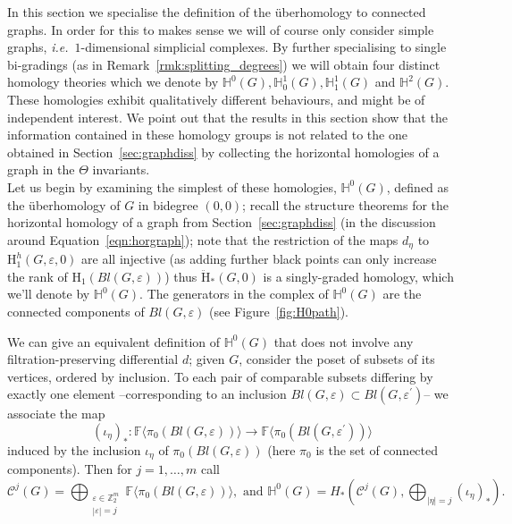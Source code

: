 \documentclass[11pt, a4paper, reqno, twoside, makeidx]{amsart}
\theoremstyle{remark}
\theoremstyle{plain}
\theoremstyle{definition}
\newcommand{\Z}{\mathbb{Z}}
\newcommand{\F}{\mathbb{F}}
\newcommand{\HH}{\mathrm{H}}
\newcommand{\uH}{\ddot{\mathrm{H}}}
\begin{document}
In this section we specialise the definition of the \"uberhomology to connected graphs.
In order for this to makes sense we will of course only consider simple graphs, \emph{i.e.}~$1$-dimensional simplicial complexes. By further specialising to single bi-gradings (as in Remark~\ref{rmk:splitting_degrees}) we will obtain four distinct homology theories which we denote by $\mathbb{H}^0(G), \mathbb{H}^1_0(G), \mathbb{H}^1_1(G)$ and $\mathbb{H}^2 (G)$. These homologies exhibit qualitatively different behaviours, and might be of independent interest. We point out that the results in this section show that the information contained in these homology groups is not related to the one obtained in Section~\ref{sec:graphdiss} by collecting the horizontal homologies of a graph in the $\Theta$ invariants. \\

Let us begin by examining the simplest of these homologies, $\mathbb{H}^0(G)$, defined as the \"uberhomology of $G$ in bidegree $(0,0)$; recall the structure theorems for the horizontal homology of a graph from Section~\ref{sec:graphdiss} (in the discussion around Equation~\eqref{eqn:horgraph}); note that the restriction of the maps $d_{\eta}$ to $\HH^h_1(G, \varepsilon , 0)$ are all injective (as adding further black points can only increase the rank of $\HH_1(Bl(G,\varepsilon))$) thus  $\uH_*(G, 0)$ is a singly-graded homology, which we'll denote by $\mathbb{H}^0(G)$.
The generators in the complex of $\mathbb{H}^0(G)$ are the connected components of $Bl(G,\varepsilon)$ (see Figure~\ref{fig:H0path}).

We can give an equivalent definition of $\mathbb{H}^0(G)$ that does not involve any filtration-preserving differential $d$; given $G$, 
consider the poset of subsets of its vertices, ordered by inclusion. To each pair of comparable subsets differing by exactly one element --corresponding to an inclusion $Bl(G,\varepsilon) \subset Bl(G ,\varepsilon^\prime)$-- we associate the map $$(\iota_\eta)_* : \F\langle \pi_0(Bl(G,\varepsilon)) \rangle \longrightarrow \F\langle\pi_0(Bl(G,\varepsilon^\prime)) \rangle $$ induced by the inclusion $\iota_\eta$ of $\pi_0(Bl(G,\varepsilon))$ (here $\pi_0$ is the set of connected components).
Then for $j = 1, \ldots, m$ call $$\mathcal{C}^j (G) = \bigoplus_{\substack{\varepsilon \in \Z_2^m \\ |\varepsilon| = j}} \F \langle \pi_0 (Bl(G, \varepsilon)) \rangle, \text{ and } \mathbb{H}^0(G) = H_*\left(\mathcal{C}^j (G),\bigoplus_{|\eta| = j} (\iota_{\eta})_*\right).$$
\end{document}
